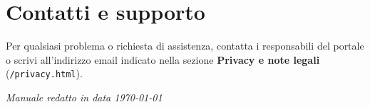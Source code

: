\documentclass[a4paper,12pt]{article}
\begin{document}
	\section{Contatti e supporto}
	
	Per qualsiasi problema o richiesta di assistenza, contatta i responsabili del portale o scrivi all'indirizzo email indicato nella sezione \textbf{Privacy e note legali} (\texttt{/privacy.html}).
	
	\vspace{1cm}
	\begin{center}
		\textit{Manuale redatto in data \today}
	\end{center}
	
\end{document}
